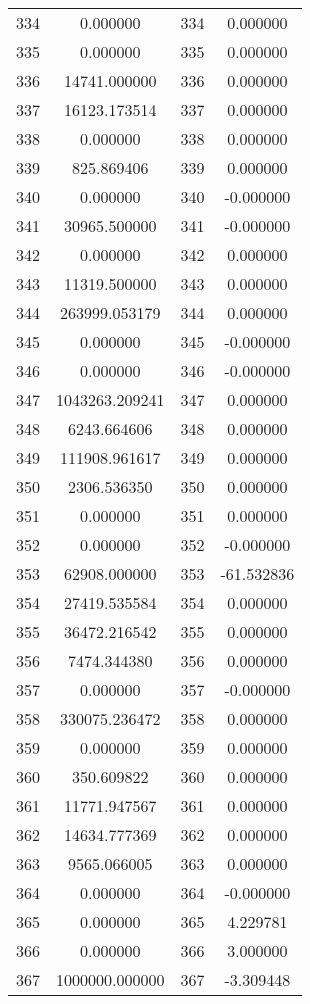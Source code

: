 \documentclass[12pt]{article}
\begin{document}
\begin{longtable}{@{}cccc@{}}
334 & 0.000000 & 334 & 0.000000 \\
335 & 0.000000 & 335 & 0.000000 \\
336 & 14741.000000 & 336 & 0.000000 \\
337 & 16123.173514 & 337 & 0.000000 \\
338 & 0.000000 & 338 & 0.000000 \\
339 & 825.869406 & 339 & 0.000000 \\
340 & 0.000000 & 340 & -0.000000 \\
341 & 30965.500000 & 341 & -0.000000 \\
342 & 0.000000 & 342 & 0.000000 \\
343 & 11319.500000 & 343 & 0.000000 \\
344 & 263999.053179 & 344 & 0.000000 \\
345 & 0.000000 & 345 & -0.000000 \\
346 & 0.000000 & 346 & -0.000000 \\
347 & 1043263.209241 & 347 & 0.000000 \\
348 & 6243.664606 & 348 & 0.000000 \\
349 & 111908.961617 & 349 & 0.000000 \\
350 & 2306.536350 & 350 & 0.000000 \\
351 & 0.000000 & 351 & 0.000000 \\
352 & 0.000000 & 352 & -0.000000 \\
353 & 62908.000000 & 353 & -61.532836 \\
354 & 27419.535584 & 354 & 0.000000 \\
355 & 36472.216542 & 355 & 0.000000 \\
356 & 7474.344380 & 356 & 0.000000 \\
357 & 0.000000 & 357 & -0.000000 \\
358 & 330075.236472 & 358 & 0.000000 \\
359 & 0.000000 & 359 & 0.000000 \\
360 & 350.609822 & 360 & 0.000000 \\
361 & 11771.947567 & 361 & 0.000000 \\
362 & 14634.777369 & 362 & 0.000000 \\
363 & 9565.066005 & 363 & 0.000000 \\
364 & 0.000000 & 364 & -0.000000 \\
365 & 0.000000 & 365 & 4.229781 \\
366 & 0.000000 & 366 & 3.000000 \\
367 & 1000000.000000 & 367 & -3.309448 \\

\end{longtable}
\end{document}
